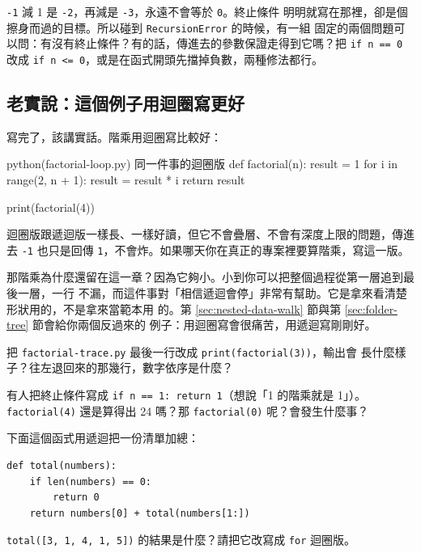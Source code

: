 \texttt{-1} 減 1 是 \texttt{-2}，再減是 \texttt{-3}，永遠不會等於 \texttt{0}。終止條件
明明就寫在那裡，卻是個擦身而過的目標。所以碰到 \texttt{RecursionError} 的時候，有一組
固定的兩個問題可以問：有沒有終止條件？有的話，傳進去的參數保證走得到它嗎？把
\texttt{if n == 0} 改成 \texttt{if n <= 0}，或是在函式開頭先擋掉負數，兩種修法都行。

\subsection*{老實說：這個例子用迴圈寫更好}

寫完了，該講實話。階乘用迴圈寫比較好：

\begin{example}{python}{(factorial-loop.py) 同一件事的迴圈版}
def factorial(n):
    result = 1
    for i in range(2, n + 1):
        result = result * i
    return result


print(factorial(4))
\end{example}


迴圈版跟遞迴版一樣長、一樣好讀，但它不會疊層、不會有深度上限的問題，傳進去 \texttt{-1}
也只是回傳 \texttt{1}，不會炸。如果哪天你在真正的專案裡要算階乘，寫這一版。

那階乘為什麼還留在這一章？因為它夠小。小到你可以把整個過程從第一層追到最後一層，一行
不漏，而這件事對「相信遞迴會停」非常有幫助。它是拿來看清楚形狀用的，不是拿來當範本用
的。第 \ref{sec:nested-data-walk} 節與第 \ref{sec:folder-tree} 節會給你兩個反過來的
例子：用迴圈寫會很痛苦，用遞迴寫剛剛好。

\begin{drills}[label=drills:recursion-return]
\item 把 \texttt{factorial-trace.py} 最後一行改成 \texttt{print(factorial(3))}，輸出會
長什麼樣子？往左退回來的那幾行，數字依序是什麼？
\item 有人把終止條件寫成 \texttt{if n == 1: return 1}（想說「1 的階乘就是 1」）。
\texttt{factorial(4)} 還是算得出 24 嗎？那 \texttt{factorial(0)} 呢？會發生什麼事？
\item 下面這個函式用遞迴把一份清單加總：
\begin{verbatim}
def total(numbers):
    if len(numbers) == 0:
        return 0
    return numbers[0] + total(numbers[1:])
\end{verbatim}
\texttt{total([3, 1, 4, 1, 5])} 的結果是什麼？請把它改寫成 \texttt{for} 迴圈版。
\end{drills}

